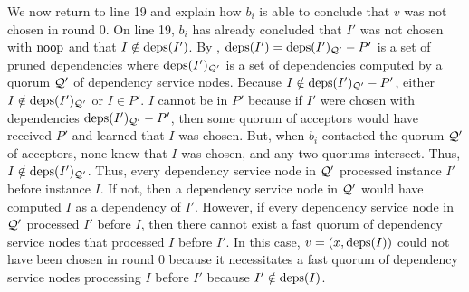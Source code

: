 We now return to line 19 and explain how $b_i$ is able to conclude that $v$ was
not chosen in round $0$. On line 19, $b_i$ has already concluded that $I'$ was
not chosen with $\text{noop}$ and that $I \notin \text{deps}(I')$. By
, $\text{deps}(I') = \text{deps}(I')_{\mathcal{Q}'} - P'$ is a set
of pruned dependencies where $\text{deps}(I')_{\mathcal{Q}'}$ is a set of dependencies
computed by a quorum $\mathcal{Q}'$ of dependency service nodes. Because $I \notin
\text{deps}(I')_{\mathcal{Q}'} - P'$, either $I \notin \text{deps}(I')_{\mathcal{Q}'}$ or $I \in
P'$.
%
$I$ cannot be in $P'$ because if $I'$ were chosen with dependencies
$\text{deps}(I')_{\mathcal{Q}'} - P'$, then some quorum of acceptors would have received
$P'$ and learned that $I$ was chosen. But, when $b_i$ contacted the quorum
$\mathcal{Q}'$ of acceptors, none knew that $I$ was chosen, and any two quorums
intersect.
%
Thus, $I \notin \text{deps}(I')_{\mathcal{Q}'}$. Thus, every dependency service node in
$\mathcal{Q}'$ processed instance $I'$ before instance $I$. If not, then a
dependency service node in $\mathcal{Q}'$ would have computed $I$ as a dependency
of $I'$. However, if every dependency service node in $\mathcal{Q}'$ processed $I'$
before $I$, then there cannot exist a fast quorum of dependency service nodes
that processed $I$ before $I'$. In this case, $v = (x, \text{deps}(I))$ could not
have been chosen in round $0$ because it necessitates a fast quorum of
dependency service nodes processing $I$ before $I'$ because $I' \notin
\text{deps}(I)$.


